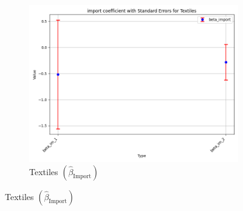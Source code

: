\documentclass{article}
\begin{document}
\begin{figure}[ht!]
    \begin{subfigure}[t]{0.32\textwidth}
        \centering
        \includegraphics[width=\textwidth]{figure/empirical_ar1_mixture_kmshare_ciiu_beta_import_with_error_bars_Textiles.png}
        \caption{Textiles $(\hat{\beta}_{\text{Import}})$}
    \end{subfigure}
\end{figure}
\end{document}
